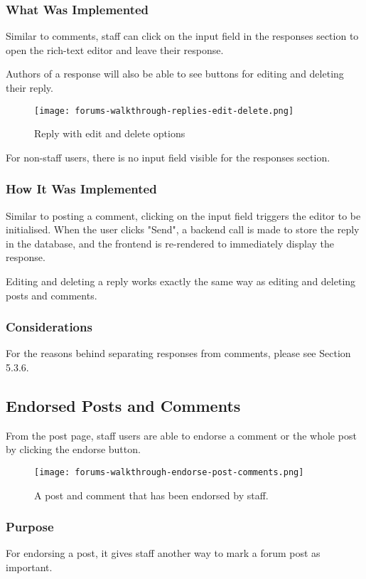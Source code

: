 \subsubsection{What Was Implemented}
Similar to comments, staff can click on the input field in the responses section to open the rich-text editor and leave their response.

Authors of a response will also be able to see buttons for editing and deleting their reply.

\begin{figure}[h!]
    \texttt{[image: forums-walkthrough-replies-edit-delete.png]}
    \centering
    \caption{Reply with edit and delete options}
\end{figure}

For non-staff users, there is no input field visible for the responses section.

\subsubsection{How It Was Implemented}
Similar to posting a comment, clicking on the input field triggers the editor to be initialised.
When the user clicks "Send", a backend call is made to store the reply in the database, and the frontend is re-rendered to immediately display the response.

Editing and deleting a reply works exactly the same way as editing and deleting posts and comments.

\subsubsection{Considerations}
For the reasons behind separating responses from comments, please see Section 5.3.6.

\subsection{Endorsed Posts and Comments}
From the post page, staff users are able to endorse a comment or the whole post by clicking the endorse button.

\begin{figure}[h!]
    \texttt{[image: forums-walkthrough-endorse-post-comments.png]}
    \centering
    \caption{A post and comment that has been endorsed by staff.}
\end{figure}

\subsubsection{Purpose}
For endorsing a post, it gives staff another way to mark a forum post as important.

